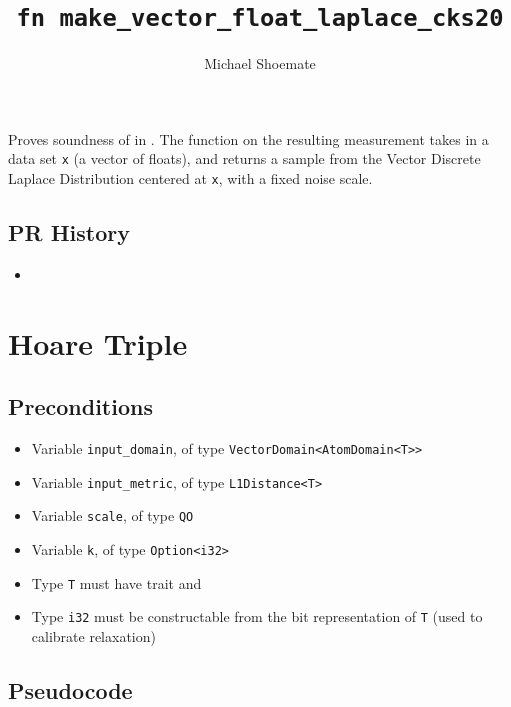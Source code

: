 \documentclass{article}
\title{\texttt{fn make\_vector\_float\_laplace\_cks20}}
\author{Michael Shoemate}
\begin{document}
\maketitle

\contrib

Proves soundness of  in .
The function on the resulting measurement takes in a data set \texttt{x} (a vector of floats), 
and returns a sample from the Vector Discrete Laplace Distribution centered at \texttt{x}, with a fixed noise scale.

\subsection*{PR History}
\begin{itemize}
    \item {}
\end{itemize}

\section{Hoare Triple}

\subsection*{Preconditions}
\begin{itemize}
    \item Variable \texttt{input\_domain}, of type \texttt{VectorDomain<AtomDomain<T>>}
    \item Variable \texttt{input\_metric}, of type \texttt{L1Distance<T>}
    \item Variable \texttt{scale}, of type \texttt{QO}
    \item Variable \texttt{k}, of type \texttt{Option<i32>}
    \item Type \texttt{T} must have trait  and 
    \item Type \texttt{i32} must be constructable from the bit representation of \texttt{T} (used to calibrate relaxation)
\end{itemize}

\subsection*{Pseudocode}

\end{document}
